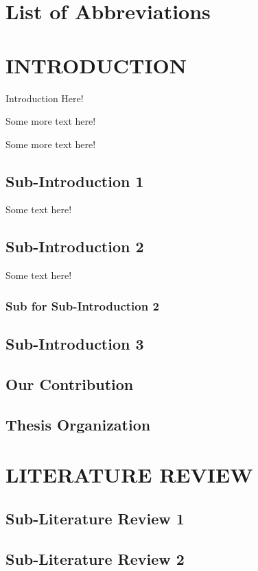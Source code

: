 \documentclass[12pt,a4paper]{report}
\begin{document}
\chapter*{List of Abbreviations}
\begin{acronym}[TDMA]
	\setlength{\itemsep}{-\parsep}
\end{acronym}
\chapter{INTRODUCTION}
\noindent{\rule{\textwidth}{1.5pt}}

\setcounter{page}{1}
Introduction Here!
\par
Some more text here!
\par
Some more text here! 
\section{Sub-Introduction 1}
Some text here!
\section{Sub-Introduction 2}
Some text here!
\subsection*{Sub for Sub-Introduction 2}
\section{Sub-Introduction 3}
\section{Our Contribution}
\section{Thesis Organization}
\chapter{LITERATURE REVIEW}
\noindent{\rule{\textwidth}{1.5pt}}
\section{Sub-Literature Review 1}
\section{Sub-Literature Review 2}
\end{document}
